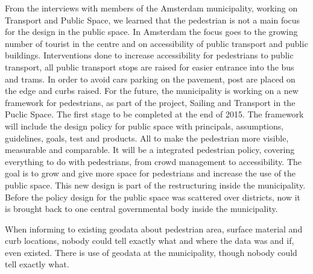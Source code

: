 From the interviews with members of the Amsterdam municipality, working on Transport and Public Space, we learned that the pedestrian is not a main focus for the design in the public space. In Amsterdam the focus goes to the growing number of tourist in the centre and on accessibility of public transport and public buildings. Interventions done to increase accessibility for pedestrians to public transport, all public transport stops are raised for easier entrance into the bus and trams. In order to avoid cars parking on the pavement, post are placed on the edge and curbs raised. For the future, the municipality is working on a new framework for pedestrians, as part of the project, Sailing and Transport in the Puclic Space. The first stage to be completed at the end of 2015. The framework will include the design policy for public space with principals, assumptions, guidelines, goals, test and products. All to make the pedestrian more visible, measurable and comparable. It will be a integrated pedestrian policy, covering everything to do with pedestrians, from crowd management to accessibility.
The goal is to grow and give more space for pedestrians and increase the use of the public space. This new design is part of the restructuring inside the municipality. Before the policy design for the public space was scattered over districts, now it is brought back to one central governmental body inside the municipality.

When informing to existing geodata about pedestrian area, surface material and curb locations, nobody could tell exactly what and where the data was and if, even existed. There is use of geodata at the municipality, though nobody could tell exactly what. 


